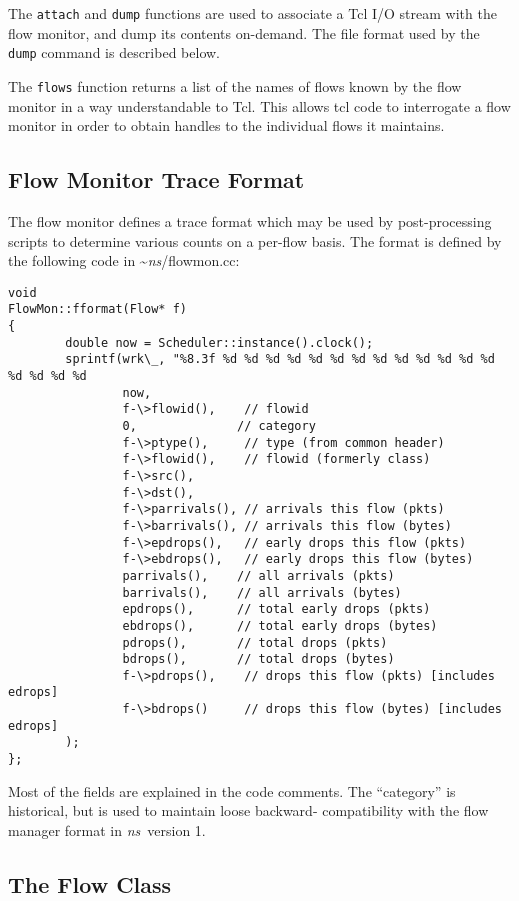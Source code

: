The {\tt attach} and {\tt dump} functions are used to
associate a Tcl I/O stream with the
flow monitor, and dump its contents on-demand.
The file format used by the {\tt dump} command is described below.

The {\tt flows} function returns a list of the names of flows known
by the flow monitor in a way understandable to Tcl.
This allows tcl code to interrogate a flow monitor in order
to obtain handles to the individual flows it maintains.

\subsection{Flow Monitor Trace Format}
\label{sec:flowmonclass}

The flow monitor defines a trace format which may be used by post-processing
scripts to determine various counts on a per-flow basis.
The format is defined by the following code in \textasciitilde\emph{ns}/{flowmon.cc}:
\begin{verbatim}
void
FlowMon::fformat(Flow* f)
{   
        double now = Scheduler::instance().clock();
        sprintf(wrk\_, "%8.3f %d %d %d %d %d %d %d %d %d %d %d %d %d %d %d %d %d 
                now,    
                f-\>flowid(),    // flowid
                0,              // category
                f-\>ptype(),     // type (from common header) 
                f-\>flowid(),    // flowid (formerly class)
                f-\>src(),
                f-\>dst(),
                f-\>parrivals(), // arrivals this flow (pkts)
                f-\>barrivals(), // arrivals this flow (bytes) 
                f-\>epdrops(),   // early drops this flow (pkts)
                f-\>ebdrops(),   // early drops this flow (bytes) 
                parrivals(),    // all arrivals (pkts)
                barrivals(),    // all arrivals (bytes) 
                epdrops(),      // total early drops (pkts)
                ebdrops(),      // total early drops (bytes) 
                pdrops(),       // total drops (pkts)
                bdrops(),       // total drops (bytes) 
                f-\>pdrops(),    // drops this flow (pkts) [includes edrops] 
                f-\>bdrops()     // drops this flow (bytes) [includes edrops]
        );
};  
\end{verbatim}
Most of the fields are explained in the code comments.
The ``category'' is historical, but is used to maintain loose backward-
compatibility with the flow manager format in \emph{ns}~version 1.

\subsection{The Flow Class}
\label{sec:flowclass}

